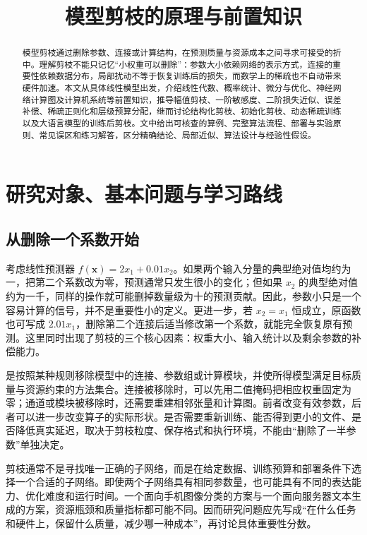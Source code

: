 \documentclass[UTF8,12pt,a4paper,fontset=fandol]{ctexart}
\title{模型剪枝的原理与前置知识}
\author{}
\date{}
\begin{document}
\maketitle

\begin{abstract}
模型剪枝通过删除参数、连接或计算结构，在预测质量与资源成本之间寻求可接受的折中。理解剪枝不能只记忆“小权重可以删除”：参数大小依赖网络的表示方式，连接的重要性依赖数据分布，局部扰动不等于恢复训练后的损失，而数学上的稀疏也不自动带来硬件加速。本文从具体线性模型出发，介绍线性代数、概率统计、微分与优化、神经网络计算图及计算机系统等前置知识，推导幅值剪枝、一阶敏感度、二阶损失近似、误差补偿、稀疏正则化和层级预算分配，继而讨论结构化剪枝、初始化剪枝、动态稀疏训练以及大语言模型的训练后剪枝。文中给出可核查的算例、完整算法流程、部署与实验原则、常见误区和练习解答，区分精确结论、局部近似、算法设计与经验性假设。
\end{abstract}
\tableofcontents

\section{研究对象、基本问题与学习路线}
\label{sec:prune-introduction}

\subsection{从删除一个系数开始}
考虑线性预测器 $f(\mathbf x)=2x_1+0.01x_2$。如果两个输入分量的典型绝对值均约为一，把第二个系数改为零，预测通常只发生很小的变化；但如果 $x_2$ 的典型绝对值约为一千，同样的操作就可能删掉数量级为十的预测贡献。因此，参数小只是一个容易计算的信号，并不是重要性小的定义。更进一步，若 $x_2=x_1$ 恒成立，原函数也可写成 $2.01x_1$，删除第二个连接后适当修改第一个系数，就能完全恢复原有预测。这里同时出现了剪枝的三个核心因素：权重大小、输入统计以及剩余参数的补偿能力。

是按照某种规则移除模型中的连接、参数组或计算模块，并使所得模型满足目标质量与资源约束的方法集合。连接被移除时，可以先用二值掩码把相应权重固定为零；通道或模块被移除时，还需要重建相邻张量和计算图。前者改变有效参数，后者可以进一步改变算子的实际形状。是否需要重新训练、能否得到更小的文件、是否降低真实延迟，取决于剪枝粒度、保存格式和执行环境，不能由“删除了一半参数”单独决定。

剪枝通常不是寻找唯一正确的子网络，而是在给定数据、训练预算和部署条件下选择一个合适的子网络。即使两个子网络具有相同参数量，也可能具有不同的表达能力、优化难度和运行时间。一个面向手机图像分类的方案与一个面向服务器文本生成的方案，资源瓶颈和质量指标都可能不同。因而研究问题应先写成“在什么任务和硬件上，保留什么质量，减少哪一种成本”，再讨论具体重要性分数。
\end{document}
